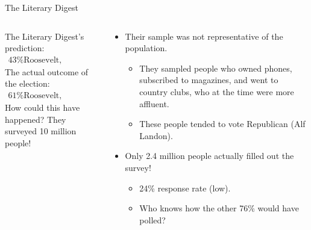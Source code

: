 \documentclass[aspectratio=169]{../latex_main/tntbeamer}  %
\begin{document}
	
	\begin{frame}{The Literary Digest}
	    \begin{columns}
	        \begin{column}{.4\textwidth}
	            \bigskip


	            The Literary Digest’s prediction:
                \begin{align*}
                    \text{43\% Roosevelt, 57\% Landon}
                \end{align*}
                The actual outcome of the election:
                \begin{align*}
                    \text{61\% Roosevelt, 37\% Landon}
                \end{align*}
                How could this have happened? They surveyed 10 million people!
	        \end{column}
	        
	        \begin{column}{.5\textwidth}
	            \begin{itemize}
	                \item Their sample was not representative of the population.
	                \begin{itemize}
	                    \item They sampled people who owned phones, subscribed to magazines, and went to country clubs, who at the time were more affluent.
	                    \item These people tended to vote Republican (Alf Landon).
	                \end{itemize}
	                \item Only 2.4 million people actually filled out the survey!
	                \begin{itemize}
	                    \item 24\% response rate (low).
	                    \item Who knows how the other 76\% would have polled?
	                \end{itemize}
	            \end{itemize}
	        \end{column}
	        
	    \end{columns}
	    
	\end{frame}
	
\end{document}
